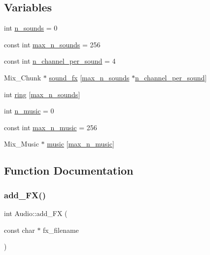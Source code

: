 \subsection*{Variables}
\begin{DoxyCompactItemize}
\item 
int \mbox{\hyperlink{namespace_audio_a72f0021eb0e6702063affe3dd2dd0d7d}{n\+\_\+sounds}} = 0
\item 
const int \mbox{\hyperlink{namespace_audio_a0f535450e240117fb4fcaa86c1cc99c7}{max\+\_\+n\+\_\+sounds}} = 256
\item 
const int \mbox{\hyperlink{namespace_audio_aec2041a2957ceb8f8646d1e56a504898}{n\+\_\+channel\+\_\+per\+\_\+sound}} = 4
\item 
Mix\+\_\+\+Chunk $\ast$ \mbox{\hyperlink{namespace_audio_ae3973e12013a4dc43241f0200d559890}{sound\+\_\+fx}} \mbox{[}\mbox{\hyperlink{namespace_audio_a0f535450e240117fb4fcaa86c1cc99c7}{max\+\_\+n\+\_\+sounds}} $\ast$\mbox{\hyperlink{namespace_audio_aec2041a2957ceb8f8646d1e56a504898}{n\+\_\+channel\+\_\+per\+\_\+sound}}\mbox{]}
\item 
int \mbox{\hyperlink{namespace_audio_a71cdec3ecb580136aec8edc6a9024c66}{ring}} \mbox{[}\mbox{\hyperlink{namespace_audio_a0f535450e240117fb4fcaa86c1cc99c7}{max\+\_\+n\+\_\+sounds}}\mbox{]}
\item 
int \mbox{\hyperlink{namespace_audio_aeeef9c9e2deb568319c142902194ea74}{n\+\_\+music}} = 0
\item 
const int \mbox{\hyperlink{namespace_audio_aa91efb37b561b15ba9999f2e7e4dce8f}{max\+\_\+n\+\_\+music}} = 256
\item 
Mix\+\_\+\+Music $\ast$ \mbox{\hyperlink{namespace_audio_adffea44d4332af6d5b77e977b0012bfc}{music}} \mbox{[}\mbox{\hyperlink{namespace_audio_aa91efb37b561b15ba9999f2e7e4dce8f}{max\+\_\+n\+\_\+music}}\mbox{]}
\end{DoxyCompactItemize}


\subsection{Function Documentation}
\mbox{\label{namespace_audio_a74272f7cb6f9113f1ab6308c82bda0f5}} 
\subsubsection{\texorpdfstring{add\+\_\+\+F\+X()}{add\_FX()}}
{\footnotesize\ttfamily int Audio\+::add\+\_\+\+FX (\begin{DoxyParamCaption}\item[{const char $\ast$}]{fx\+\_\+filename }\end{DoxyParamCaption})}

